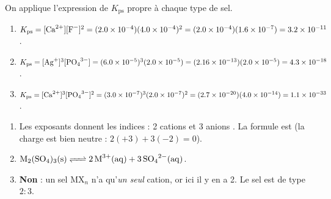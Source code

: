 \documentclass[11pt,a4paper]{article}
\begin{document}
\begin{corrige}
On applique l'expression de $K_{\mathrm{ps}}$ propre à chaque type de sel.
\begin{enumerate}[label=\alph*)]
  \item $K_{\mathrm{ps}} = [\ce{Ca^{2+}}][\ce{F-}]^{2} = (\num{2.0e-4})(\num{4.0e-4})^{2}
         = (\num{2.0e-4})(\num{1.6e-7}) = \num{3.2e-11}$.
  \item $K_{\mathrm{ps}} = [\ce{Ag+}]^{3}[\ce{PO4^{3-}}] = (\num{6.0e-5})^{3}(\num{2.0e-5})
         = (\num{2.16e-13})(\num{2.0e-5}) = \num{4.3e-18}$.
  \item $K_{\mathrm{ps}} = [\ce{Ca^{2+}}]^{3}[\ce{PO4^{3-}}]^{2} = (\num{3.0e-7})^{3}(\num{2.0e-7})^{2}
         = (\num{2.7e-20})(\num{4.0e-14}) = \num{1.1e-33}$.
\end{enumerate}
\end{corrige}

\begin{corrige}
\begin{enumerate}[label=\alph*)]
  \item Les exposants donnent les indices : 2 cations  et 3 anions . La
        formule est  (la charge est bien neutre : $2(+3)+3(-2)=0$).
  \item $\ce{M2(SO4)3(s) <=> 2 M^{3+}(aq) + 3 SO4^{2-}(aq)}$.
  \item \textbf{Non} : un sel $\mathrm{MX}_n$ n'a qu'\emph{un seul} cation, or ici il y en a 2. Le sel
        est de type $2{:}3$.
\end{enumerate}
\end{corrige}
\end{document}
